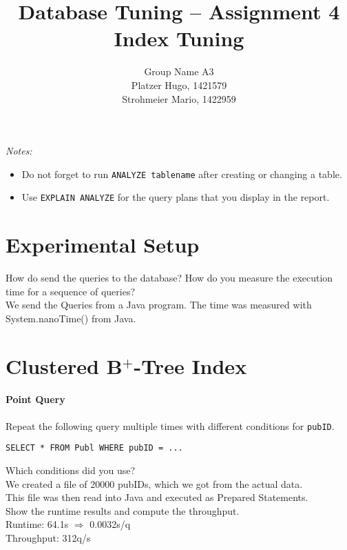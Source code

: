 \documentclass[11pt]{scrartcl}
\title{
  \textbf{\large Database Tuning -- Assignment 4}\\
  Index Tuning
}
\author{
 Group Name A3\\
 \large Platzer Hugo, 1421579 \\
 \large Strohmeier Mario, 1422959 \\
}
\begin{document}
\maketitle

\noindent
{\it Notes:}
\begin{itemize}\itemsep=0pt
\item Do not forget to run {\tt ANALYZE tablename} after creating or
  changing a table.
\item Use {\tt EXPLAIN ANALYZE} for the query plans that you display in the report.
\end{itemize}


\section{Experimental Setup}

How do send the queries to the database? How do you measure the
execution time for a sequence of queries?\\
We send the Queries from a Java program. The time was measured with System.nanoTime() from Java.

\section{Clustered B$^+$-Tree Index}

\paragraph{Point Query}

Repeat the following query multiple times with different conditions for {\tt pubID}.

{\small
\begin{verbatim}
SELECT * FROM Publ WHERE pubID = ...
\end{verbatim}
}

\noindent
Which conditions did you use?\\
We created a file of 20000 pubIDs, which we got from the actual data.\\
This file was then read into Java and executed as Prepared Statements.\\

\smallskip\noindent
Show the runtime results and compute the throughput.\\
Runtime: 64.1s $\Rightarrow$ 0.0032s/q\\
Throughput: 312q/s\\
\end{document}

